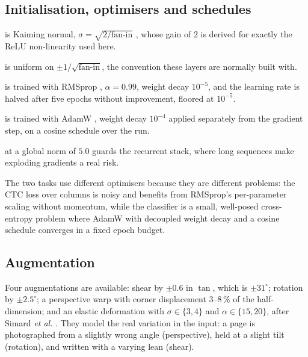 \documentclass[11pt,a4paper]{article}
\begin{document}
\subsection{Initialisation, optimisers and schedules}

\begin{description}[leftmargin=2em]
\item[Convolution initialisation] is Kaiming normal,
$\sigma = \sqrt{2/\text{fan-in}}$ \cite{he2015}, whose gain of $2$ is derived
for exactly the ReLU non-linearity used here.
\item[Linear and LSTM initialisation] is uniform on
$\pm 1/\sqrt{\text{fan-in}}$, the convention these layers are normally built
with.
\item[The reader] is trained with RMSprop \cite[Lec.~6e]{tieleman2012},
$\alpha = 0.99$, weight decay $10^{-5}$, and the learning rate is halved after
five epochs without improvement, floored at $10^{-5}$.
\item[The writer classifier] is trained with AdamW
\cite[Alg.~2]{loshchilov2019}, weight decay $10^{-4}$ applied separately from
the gradient step, on a cosine schedule \cite{loshchilov2017} over the run.
\item[Gradient clipping] at a global norm of $5.0$ \cite[Alg.~1]{pascanu2013}
guards the recurrent stack, where long sequences make exploding gradients a real
risk.
\end{description}

The two tasks use different optimisers because they are different problems: the
CTC loss over \ArchFrames{} columns is noisy and benefits from RMSprop's
per-parameter scaling without momentum, while the classifier is a small,
well-posed cross-entropy problem where AdamW with decoupled weight decay and a
cosine schedule converges in a fixed epoch budget.

\subsection{Augmentation}

Four augmentations are available: shear by $\pm 0.6$ in $\tan$, which is
$\pm 31^\circ$; rotation by $\pm 2.5^\circ$; a perspective warp with corner
displacement $3$--$8\,\%$ of the half-dimension; and an elastic deformation with
$\sigma \in \{3,4\}$ and $\alpha \in \{15,20\}$, after Simard \textit{et al.}
\cite{simard2003}. They model the real variation in the input: a page is
photographed from a slightly wrong angle (perspective), held at a slight tilt
(rotation), and written with a varying lean (shear).
\end{document}
